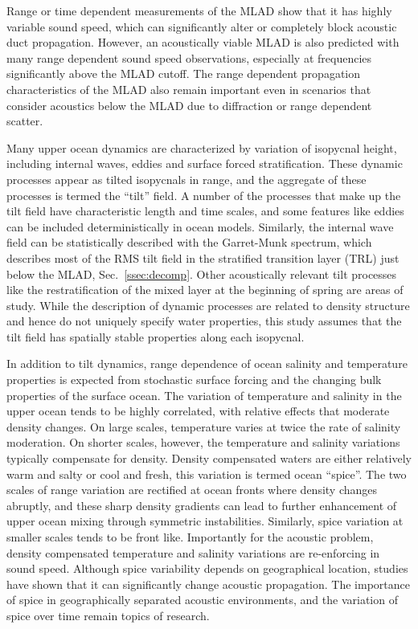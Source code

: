 \documentclass[preprint,NumberedRefs]{JASA}
\begin{document}
Range or time dependent measurements of the MLAD show that it has highly variable sound speed,\citep{cole2010seasonal,rudnick1999compensation,klymak2015} which can significantly alter or completely block acoustic duct propagation.\citep{colosi2020observations,colosi21} However, an acoustically viable MLAD is also predicted with many range dependent sound speed observations, especially at frequencies significantly above the MLAD cutoff. The range dependent propagation characteristics of the MLAD also remain important even in scenarios that consider acoustics below the MLAD due to diffraction or range dependent scatter.\citep{colosi21}

Many upper ocean dynamics are characterized by variation of isopycnal height, including internal waves, eddies and surface forced stratification. These dynamic processes appear as tilted isopycnals in range, and the aggregate of these processes is termed the ``tilt'' field.\cite{dzieciuch2004} A number of the processes that make up the tilt field have characteristic length and time scales, and some features like eddies can be included deterministically in ocean models. Similarly, the internal wave field can be statistically described with the Garret-Munk spectrum,\cite{garrett1972space} which describes most of the RMS tilt field in the stratified transition layer (TRL) just below the MLAD, Sec.~\ref{ssec:decomp}. Other acoustically relevant tilt processes like the restratification of the mixed layer at the beginning of spring are areas of study.\cite{cole2010seasonal} While the description of dynamic processes are related to density structure and hence do not uniquely specify water properties, this study assumes that the tilt field has spatially stable properties along each isopycnal.

In addition to tilt dynamics, range dependence of ocean salinity and temperature properties is expected from stochastic surface forcing and the changing bulk properties of the surface ocean\citep{ferrari2000}. The variation of temperature and salinity in the upper ocean tends to be highly correlated, with relative effects that moderate density changes. On large scales, temperature varies at twice the rate of salinity moderation. On shorter scales, however, the temperature and salinity variations typically compensate for density. Density compensated waters are either relatively warm and salty or cool and fresh, this variation is termed ocean ``spice''\citep{munk1981evolution}. The two scales of range variation are rectified at ocean fronts where density changes abruptly, and these sharp density gradients can lead to further enhancement of upper ocean mixing through symmetric instabilities\citep{dasaro2011}. Similarly, spice variation at smaller scales tends to be front like.\cite{rudnick1999compensation} Importantly for the acoustic problem, density compensated temperature and salinity variations are re-enforcing in sound speed. Although spice variability depends on geographical location, studies have shown that it can significantly change acoustic propagation.\citep{colosi12,colosi13,murat2021} The importance of spice in geographically separated acoustic environments, and the variation of spice over time remain topics of research.
\end{document}
